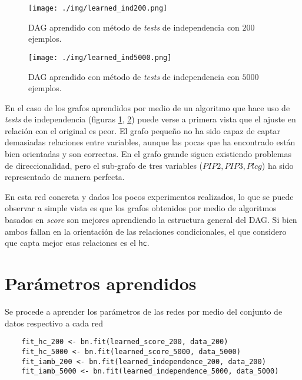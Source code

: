 \documentclass[12pt,letterpaper]{article}
\begin{document}
\begin{figure}[htp]
    \centering
    \texttt{[image: ./img/learned\_ind200.png]}
    \caption{DAG aprendido con método de \textit{tests} de independencia con $200$ ejemplos.}
    \label{fig:learnedindp200}
\end{figure}
\begin{figure}[htp]
    \centering
    \texttt{[image: ./img/learned\_ind5000.png]}
    \caption{DAG aprendido con método de \textit{tests} de independencia con $5000$ ejemplos.}
    \label{fig:learnedindp5000}
\end{figure}

En el caso de los grafos aprendidos por medio de un algoritmo que hace uso de \textit{tests} de independencia (figuras \ref{fig:learnedindp200}, \ref{fig:learnedindp5000}) puede verse a primera vista que el ajuste en relación con el original es peor.
El grafo pequeño no ha sido capaz de captar demasiadas relaciones entre variables, aunque las pocas que ha encontrado están bien orientadas y son correctas. En el grafo grande siguen existiendo problemas de direccionalidad, pero el sub-grafo de tres variables ($PIP2, PIP3, Plcg$) ha sido representado de manera perfecta.

En esta red concreta y dados los pocos experimentos realizados, lo que se puede observar a simple vista es que los grafos obtenidos por medio de algoritmos basados en \textit{score} son mejores aprendiendo la estructura general del DAG. Si bien ambos fallan en la orientación de las relaciones condicionales, el que considero que capta mejor esas relaciones es el \texttt{hc}.

\section{Parámetros aprendidos}
Se procede a aprender los parámetros de las redes por medio del conjunto de datos respectivo a cada red
\begin{lstlisting}
    fit_hc_200 <- bn.fit(learned_score_200, data_200)
    fit_hc_5000 <- bn.fit(learned_score_5000, data_5000)
    fit_iamb_200 <- bn.fit(learned_independence_200, data_200)
    fit_iamb_5000 <- bn.fit(learned_independence_5000, data_5000)
\end{lstlisting}
\end{document}

